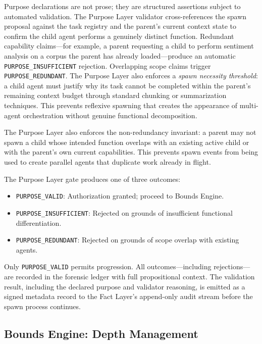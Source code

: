 Purpose declarations are not prose; they are structured assertions subject to automated validation. The Purpose Layer validator cross-references the spawn proposal against the task registry and the parent's current context state to confirm the child agent performs a genuinely distinct function. Redundant capability claims---for example, a parent requesting a child to perform sentiment analysis on a corpus the parent has already loaded---produce an automatic \texttt{PURPOSE\_INSUFFICIENT} rejection. Overlapping scope claims trigger \texttt{PURPOSE\_REDUNDANT}. The Purpose Layer also enforces a \textit{spawn necessity threshold}: a child agent must justify why its task cannot be completed within the parent's remaining context budget through standard chunking or summarization techniques. This prevents reflexive spawning that creates the appearance of multi-agent orchestration without genuine functional decomposition.

The Purpose Layer also enforces the non-redundancy invariant: a parent may not spawn a child whose intended function overlaps with an existing active child or with the parent's own current capabilities. This prevents spawn events from being used to create parallel agents that duplicate work already in flight.

The Purpose Layer gate produces one of three outcomes:

\begin{itemize}
    \itemsep0em
    \item \texttt{PURPOSE\_VALID}: Authorization granted; proceed to Bounds Engine.
    \item \texttt{PURPOSE\_INSUFFICIENT}: Rejected on grounds of insufficient functional differentiation.
    \item \texttt{PURPOSE\_REDUNDANT}: Rejected on grounds of scope overlap with existing agents.
\end{itemize}

Only \texttt{PURPOSE\_VALID} permits progression. All outcomes---including rejections---are recorded in the forensic ledger with full propositional context. The validation result, including the declared purpose and validator reasoning, is emitted as a signed metadata record to the Fact Layer's append-only audit stream before the spawn process continues.

\subsection{Bounds Engine: Depth Management}
\label{sec:rsp-bounds-engine}

